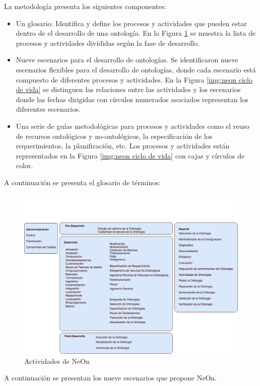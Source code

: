 La metodología presenta los siguientes componentes:
\begin{itemize}
    \item Un glosario: Identifica y define los procesos y actividades que pueden estar dentro de el desarrollo de una ontología. En la Figura \ref{img:neon actividades} se muestra la lista de procesos y actividades divididas según la fase de desarrollo.
    \item Nueve escenarios para el desarrollo de ontologías. Se identificaron nueve escenarios flexibles para el desarrollo de ontologías, donde cada escenario está compuesto de diferentes procesos y actividades. En la Figura \ref{img:neon ciclo de vida} se distinguen las relaciones entre las actividades y los escenarios donde las fechas dirigidas con círculos numerados asociados representan los diferentes escenarios. 
    \item Una serie de guías metodológicas para procesos y actividades como el reuso de recursos ontológicos y no-ontológicos, la especificación de los requerimientos, la planificación, etc. Los procesos y actividades están representados en la Figura \ref{img:neon ciclo de vida} con cajas y círculos de color.
\end{itemize}

A continuación se presenta el glosario de términos:
\begin{figure}[h!]
    \centering
    \includegraphics[width=150mm]{figuras/Diagramas-NeonActivities}
    \caption{Actividades de NeOn}
    \label{img:neon actividades}
    \end{figure}


A continuación se presentan los nueve escenarios que propone NeOn.

